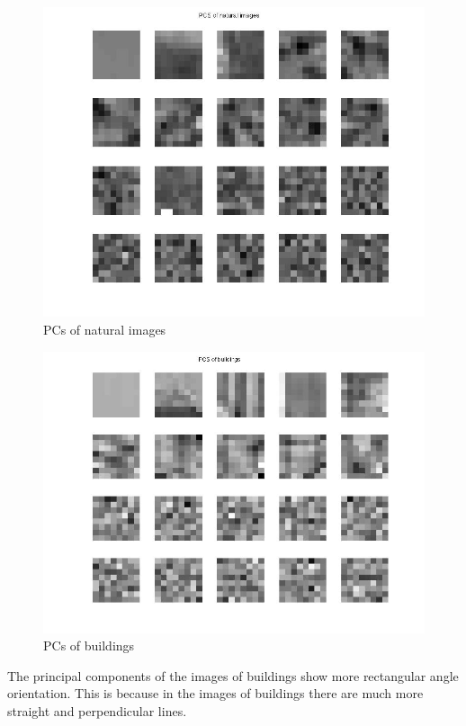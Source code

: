 \documentclass[]{article}
\begin{document}
\begin{figure}[h]
	\centering
		\includegraphics[width=\textwidth]{pc_natural.jpg}
	\caption{PCs of natural images}
	\label{sg:fig:pc_natural}
\end{figure}

\begin{figure}[h]
	\centering
		\includegraphics[width=\textwidth]{pc_buildings.jpg}
	\caption{PCs of buildings}
	\label{sg:fig:pc_buildings}
\end{figure}

The principal components of the images of buildings show more rectangular angle orientation.
This is because in the images of buildings there are much more straight and
perpendicular lines.
\end{document}
